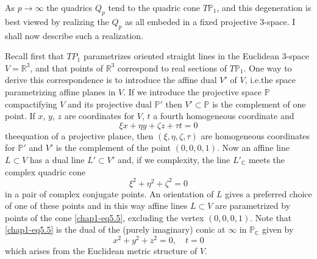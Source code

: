 As $p\to\infty$ the quadrics $Q_{p}$ tend to the quadric cone
$T\mathbb{P}_{1}$, and this degeneration is best viewed by realizing
the $Q_{p}$ as all embeded in a fixed projective 3-space. I shall now
describe such a realization.

Recall first that $TP_{1}$ parametrizes oriented straight lines in the
Euclidean 3-space $V=\mathbb{R}^{3}$, and that points of
$\mathbb{R}^{3}$ correspond to real sections of $T\mathbb{P}_{1}$. One
way to derive this correspondence is to introduce the affine dual $V'$
of $V$, i.e.\@ the space parametrizing affine planes in $V$. If we
introduce the projective space $\mathbb{P}$ compactifying $V$ and its
projective dual $\mathbb{P}'$ then $V'\subset \mathbb{P}$ is the
complement of one point. If $x$, $y$, $z$ are coordinates for $V$, $t$
a fourth homogeneous coordinate and 
\begin{equation}
\xi x+\eta y+\zeta z+\tau t=0\label{chap1-eq5.4}
\end{equation}
the\pageoriginale equation of a projective plance, then
$(\xi,\eta,\zeta,\tau)$ are homogeneous coordinates for $\mathbb{P}'$
and $V'$ is the complement of the point $(0,0,0,1)$. Now an affine
line $L\subset V$ has a dual line $L'\subset V'$ and, if we
complexity, the line $L'_{\mathbb{C}}$ meets the complex quadric cone
\begin{equation}
\xi^{2}+\eta^{2}+\zeta^{2}=0\label{chap1-eq5.5}
\end{equation}
in a pair of complex conjugate points. An orientation of $L$ gives a
preferred choice of one of these points and in this way affine lines
$L\subset V$ are parametrized by points of the cone
\eqref{chap1-eq5.5}, excluding the vertex $(0,0,0,1)$. Note that
\eqref{chap1-eq5.5} is the dual of the (purely imaginary) conic at
$\infty$ in $\mathbb{P}_{\mathbb{C}}$ given by
\begin{equation}
x^{2}+y^{2}+z^{2}=0,\quad t=0\label{chap1-eq5.6}
\end{equation}
which arises from the Euclidean metric structure of $V$.

